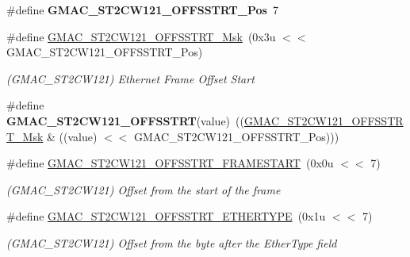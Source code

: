 \begin{DoxyCompactItemize}
\item 
\mbox{\label{group__SAMV71__GMAC_ga7c1c62749e31d5d1f778f89cc8274fb1}} 
\#define {\bfseries G\+M\+A\+C\+\_\+\+S\+T2\+C\+W121\+\_\+\+O\+F\+F\+S\+S\+T\+R\+T\+\_\+\+Pos}~7
\item 
\mbox{\label{group__SAMV71__GMAC_gaa5d9cfd6547ca84e3e577263e197b4a6}} 
\#define \mbox{\hyperlink{group__SAMV71__GMAC_gaa5d9cfd6547ca84e3e577263e197b4a6}{G\+M\+A\+C\+\_\+\+S\+T2\+C\+W121\+\_\+\+O\+F\+F\+S\+S\+T\+R\+T\+\_\+\+Msk}}~(0x3u $<$$<$ G\+M\+A\+C\+\_\+\+S\+T2\+C\+W121\+\_\+\+O\+F\+F\+S\+S\+T\+R\+T\+\_\+\+Pos)
\begin{DoxyCompactList}\small\item\em (G\+M\+A\+C\+\_\+\+S\+T2\+C\+W121) Ethernet Frame Offset Start \end{DoxyCompactList}\item 
\mbox{\label{group__SAMV71__GMAC_gaf836e267187115fcfe20a4086ddf07aa}} 
\#define {\bfseries G\+M\+A\+C\+\_\+\+S\+T2\+C\+W121\+\_\+\+O\+F\+F\+S\+S\+T\+RT}(value)~((\mbox{\hyperlink{group__SAMV71__GMAC_gaa5d9cfd6547ca84e3e577263e197b4a6}{G\+M\+A\+C\+\_\+\+S\+T2\+C\+W121\+\_\+\+O\+F\+F\+S\+S\+T\+R\+T\+\_\+\+Msk}} \& ((value) $<$$<$ G\+M\+A\+C\+\_\+\+S\+T2\+C\+W121\+\_\+\+O\+F\+F\+S\+S\+T\+R\+T\+\_\+\+Pos)))
\item 
\mbox{\label{group__SAMV71__GMAC_ga3fed2be31d3b8177272a62b3866fe01d}} 
\#define \mbox{\hyperlink{group__SAMV71__GMAC_ga3fed2be31d3b8177272a62b3866fe01d}{G\+M\+A\+C\+\_\+\+S\+T2\+C\+W121\+\_\+\+O\+F\+F\+S\+S\+T\+R\+T\+\_\+\+F\+R\+A\+M\+E\+S\+T\+A\+RT}}~(0x0u $<$$<$ 7)
\begin{DoxyCompactList}\small\item\em (G\+M\+A\+C\+\_\+\+S\+T2\+C\+W121) Offset from the start of the frame \end{DoxyCompactList}\item 
\mbox{\label{group__SAMV71__GMAC_gab8640063dffeafd4390143fc1d407ee8}} 
\#define \mbox{\hyperlink{group__SAMV71__GMAC_gab8640063dffeafd4390143fc1d407ee8}{G\+M\+A\+C\+\_\+\+S\+T2\+C\+W121\+\_\+\+O\+F\+F\+S\+S\+T\+R\+T\+\_\+\+E\+T\+H\+E\+R\+T\+Y\+PE}}~(0x1u $<$$<$ 7)
\begin{DoxyCompactList}\small\item\em (G\+M\+A\+C\+\_\+\+S\+T2\+C\+W121) Offset from the byte after the Ether\+Type field \end{DoxyCompactList}\item 

\end{DoxyCompactItemize}
